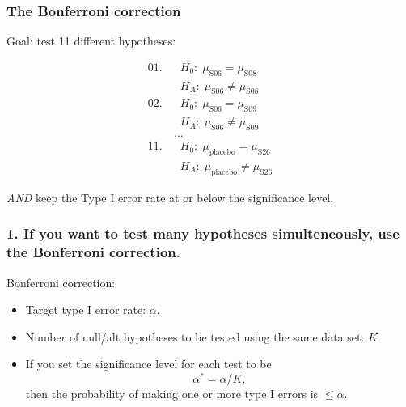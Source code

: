 \documentclass[slidestop,compress,mathserif,12pt,t,professionalfonts,xcolor=table]{beamer}
\newcommand{\bonferroni}{If you want to test many hypotheses simulteneously, use
  the Bonferroni correction.}
\begin{document}

\begin{frame}
  \frametitle{The Bonferroni correction}

Goal: test 11 different hypotheses:

{\small
\begin{align*}
01.\ &  \; \; H_0: \; \mu_{\text{S06}} = \mu_{\text{S08}} \\
     &  \; \; H_A: \; \mu_{\text{S06}} \neq \mu_{\text{S08}}  \\
02.\ &  \; \; H_0: \; \mu_{\text{S06}} = \mu_{\text{S09}} \\
     &  \; \; H_A: \; \mu_{\text{S06}} \neq \mu_{\text{S09}}  \\
& \ldots \\
11.\ &  \; \; H_0: \; \mu_{\text{placebo}} = \mu_{\text{S26}} \\
     &  \; \; H_A: \; \mu_{\text{placebo}} \neq \mu_{\text{S26}} 
\end{align*}
}

\emph{AND} keep the Type I error rate at or below the significance level.

\end{frame}


\begin{frame}
  \frametitle{1. \bonferroni}

\vfill

Bonferroni correction: 
\begin{itemize}
\item Target type I error rate: $\alpha$.

\item Number of null/alt hypotheses to be tested using the same data set: $K$

\item If you set the significance level for each test to be
\[
\alpha^* = \alpha / K,
\]
then the probability of making one or more type I errors is $ \leq \alpha$.

\end{itemize}

\vfill

\end{frame}

\end{document}
